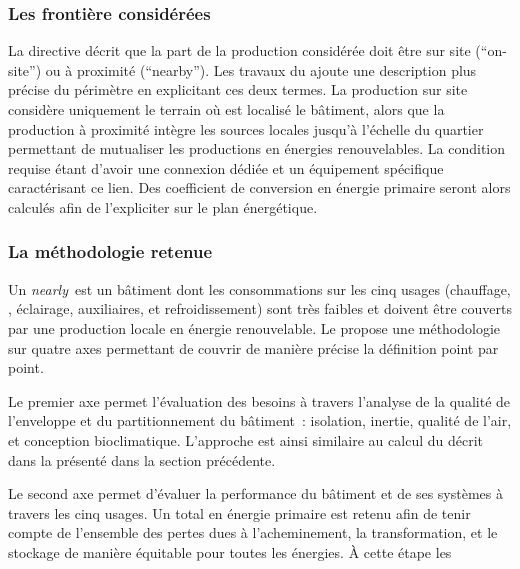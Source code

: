 \subsubsection{Les frontière considérées} %
\label{ssub:les_frontière_considérées}
La directive décrit que la part de la production considérée doit être sur site (\enquote{on-site})
ou à proximité (\enquote{nearby}). Les travaux du  ajoute une description plus précise
du périmètre en explicitant ces deux termes. La production sur site considère uniquement
le terrain où est localisé le bâtiment, alors que la production à proximité intègre
les sources locales jusqu’à l’échelle du quartier permettant de mutualiser les productions
en énergies renouvelables.
La condition requise étant d’avoir une connexion dédiée et un équipement spécifique
caractérisant ce lien. Des coefficient de conversion en énergie primaire seront
alors calculés afin de l’expliciter sur le plan énergétique.​



\subsubsection{La méthodologie retenue} %
\label{ssub:la_methodologie_retenue}
Un \textit{nearly}\, est un bâtiment dont les consommations sur les cinq usages
(chauffage, , éclairage, auxiliaires, et refroidissement)
sont très faibles et doivent être couverts par une production locale en énergie renouvelable.
Le  propose une méthodologie sur quatre axes permettant de couvrir de manière
précise la définition point par point.

Le premier axe permet l’évaluation des besoins à travers l’analyse
de la qualité de l’enveloppe et du partitionnement du bâtiment~: isolation, inertie, qualité de l’air,
et conception bioclimatique. L’approche est ainsi similaire au calcul du  décrit dans
la  présenté dans la section précédente.

Le second axe permet d’évaluer la performance du bâtiment et de ses systèmes à travers les
cinq usages. Un total en énergie primaire est retenu afin de tenir compte de l’ensemble
des pertes dues à l’acheminement, la transformation, et le stockage de manière équitable
pour toutes les énergies. À cette étape les

